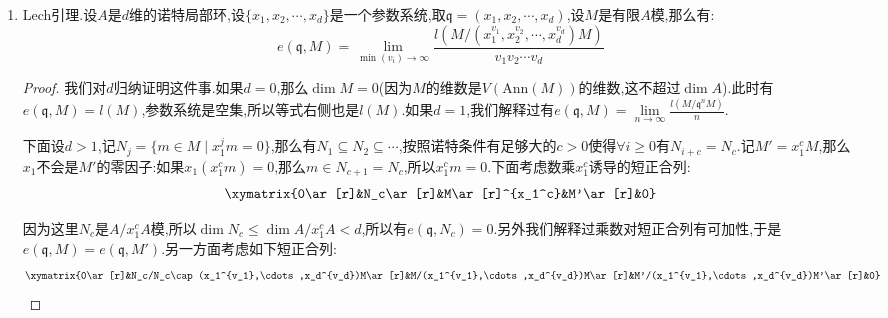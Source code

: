 \begin{enumerate}
\begin{proof}
		按照$\alpha$由$d-1$个元生成,得到$\alpha^{n-c}$可由$\left(\begin{array}{c}n-c+d-2\\d-2\end{array}\right)$个元生成,记$M$可被$r$个元生成,于是$\alpha^{n-c}M$可被$N=r\left(\begin{array}{c}n-c+d-2\\d-2\end{array}\right)$个元生成,现在作为$A/q^{c-1}$模有满同态$(A/q^{c-1})^N\to\alpha^{n-c}M/(\alpha^{n-c}M\cap q^{n-1}M)$.于是得到长度公式$l(\alpha^{n-c}M/\alpha^{n-c}M\cap q^{n-1}M)\le r\left(\begin{array}{c}n-c+d-2\\d-2\end{array}\right)l(A/q^{c-1})$.重点是这里右侧是关于$n$的$d-2$次多项式.于是等式$l(M'/(q')^nM)=l(M/q^nM)-l(M/q^{n-1}M)+l(\frac{(q^nM:x_1)}{q^{n-1}M})$右侧在$n$足够大的时候前两项是$\frac{e}{d!}n^d-\frac{e}{d!}(n-1)^d+\cdots$,第三项放缩为一个$d-2$次多项式,于是右侧可写作$\frac{e}{(d-1)!}n^{d-1}+\cdots$.这里$e=e(q,M)$,两边除去$n^{d-1}/(d-1)!$取极限$n\to\infty$就得到$e(q',M')=e(q,M)$.
	\end{proof}
	\item Lech引理.设$A$是$d$维的诺特局部环,设$\{x_1,x_2,\cdots,x_d\}$是一个参数系统,取$\mathfrak{q}=(x_1,x_2,\cdots,x_d)$,设$M$是有限$A$模,那么有:
	$$e(\mathfrak{q},M)=\lim_{\min(v_i)\to\infty}\frac{l(M/(x_1^{v_1},x_2^{v_2},\cdots,x_d^{v_d})M)}{v_1v_2\cdots v_d}$$
	\begin{proof}
		
		我们对$d$归纳证明这件事.如果$d=0$,那么$\dim M=0$(因为$M$的维数是$V(\mathrm{Ann}(M))$的维数,这不超过$\dim A$).此时有$e(\mathfrak{q},M)=l(M)$,参数系统是空集,所以等式右侧也是$l(M)$.如果$d=1$,我们解释过有$e(\mathfrak{q},M)=\lim\limits_{n\to\infty}\frac{l(M/\mathfrak{q}^nM)}{n}$.
		
		\qquad
		
		下面设$d>1$,记$N_j=\{m\in M\mid x_1^jm=0\}$,那么有$N_1\subseteq N_2\subseteq\cdots$,按照诺特条件有足够大的$c>0$使得$\forall i\ge0$有$N_{i+c}=N_c$.记$M'=x_1^cM$,那么$x_1$不会是$M'$的零因子:如果$x_1(x_1^cm)=0$,那么$m\in N_{c+1}=N_c$,所以$x_1^cm=0$.下面考虑数乘$x_1^c$诱导的短正合列:
		$$\xymatrix{0\ar[r]&N_c\ar[r]&M\ar[r]^{x_1^c}&M'\ar[r]&0}$$
		
		因为这里$N_c$是$A/x_1^cA$模,所以$\dim N_c\le\dim A/x_1^cA<d$,所以有$e(\mathfrak{q},N_c)=0$.另外我们解释过乘数对短正合列有可加性,于是$e(\mathfrak{q},M)=e(\mathfrak{q},M')$.另一方面考虑如下短正合列:
		$$\xymatrix{0\ar[r]&N_c/N_c\cap(x_1^{v_1},\cdots,x_d^{v_d})M\ar[r]&M/(x_1^{v_1},\cdots,x_d^{v_d})M\ar[r]&M'/(x_1^{v_1},\cdots,x_d^{v_d})M'\ar[r]&0}$$
		

\end{proof}
\end{enumerate}
